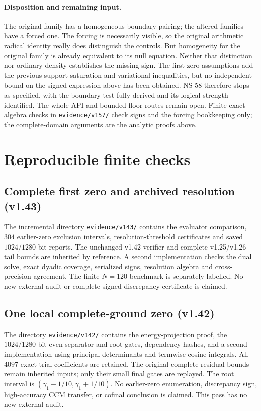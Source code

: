 \documentclass[11pt]{article}
\theoremstyle{remark}
\begin{document}
\paragraph{Disposition and remaining input.}
The original family has a homogeneous boundary pairing; the altered
families have a forced one. The forcing is necessarily visible, so
the original arithmetic radical identity really does distinguish the
controls. But homogeneity for the original family is already equivalent
to its null equation. Neither that distinction nor ordinary density
establishes the missing sign. The first-zero assumptions add the
previous support saturation and variational inequalities, but no
independent bound on the signed expression above has been obtained.
NS-58 therefore stops as specified, with the boundary test fully
derived and its logical strength identified. The whole API and
bounded-floor routes remain open. Finite exact algebra checks in
\texttt{evidence/v157/} check signs and the forcing bookkeeping only;
the complete-domain arguments are the analytic proofs above.


\appendix
\section{Reproducible finite checks}\label{app:numerics}

\subsection*{Complete first zero and archived resolution (v1.43)}
The incremental directory \texttt{evidence/v143/} contains the evaluator
comparison, $304$ earlier-zero exclusion intervals, resolution-threshold
certificates and saved $1024/1280$-bit reports. The unchanged v1.42
verifier and complete v1.25/v1.26 tail bounds are inherited by reference.
A second implementation checks the dual solve, exact dyadic coverage,
serialized signs, resolution algebra and cross-precision agreement.
The finite $N=120$ benchmark is separately labelled. No new external
audit or complete signed-discrepancy certificate is claimed.

\subsection*{One local complete-ground zero (v1.42)}
The directory \texttt{evidence/v142/} contains the energy-projection
proof, the $1024/1280$-bit even-separator and root gates, dependency
hashes, and a second implementation using principal determinants and
termwise cosine integrals. All $4097$ exact trial coefficients are
retained. The original complete residual bounds remain inherited
inputs; only their small final gates are replayed. The root interval
is $(\gamma_1-1/10,\gamma_1+1/10)$. No earlier-zero enumeration,
discrepancy sign, high-accuracy CCM transfer, or cofinal conclusion
is claimed. This pass has no new external audit.
\end{document}
